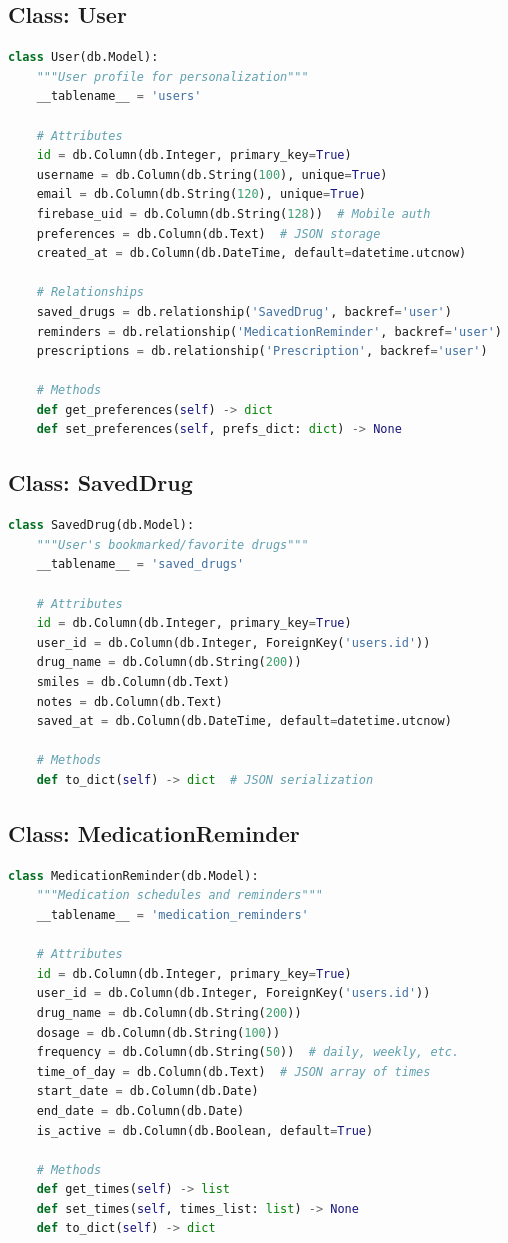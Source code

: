 \documentclass[12pt,a4paper]{report}
\begin{document}
\subsection{Class: User}
\begin{lstlisting}[language=Python]
class User(db.Model):
    """User profile for personalization"""
    __tablename__ = 'users'
    
    # Attributes
    id = db.Column(db.Integer, primary_key=True)
    username = db.Column(db.String(100), unique=True)
    email = db.Column(db.String(120), unique=True)
    firebase_uid = db.Column(db.String(128))  # Mobile auth
    preferences = db.Column(db.Text)  # JSON storage
    created_at = db.Column(db.DateTime, default=datetime.utcnow)
    
    # Relationships
    saved_drugs = db.relationship('SavedDrug', backref='user')
    reminders = db.relationship('MedicationReminder', backref='user')
    prescriptions = db.relationship('Prescription', backref='user')
    
    # Methods
    def get_preferences(self) -> dict
    def set_preferences(self, prefs_dict: dict) -> None
\end{lstlisting}

\subsection{Class: SavedDrug}
\begin{lstlisting}[language=Python]
class SavedDrug(db.Model):
    """User's bookmarked/favorite drugs"""
    __tablename__ = 'saved_drugs'
    
    # Attributes
    id = db.Column(db.Integer, primary_key=True)
    user_id = db.Column(db.Integer, ForeignKey('users.id'))
    drug_name = db.Column(db.String(200))
    smiles = db.Column(db.Text)
    notes = db.Column(db.Text)
    saved_at = db.Column(db.DateTime, default=datetime.utcnow)
    
    # Methods
    def to_dict(self) -> dict  # JSON serialization
\end{lstlisting}

\subsection{Class: MedicationReminder}
\begin{lstlisting}[language=Python]
class MedicationReminder(db.Model):
    """Medication schedules and reminders"""
    __tablename__ = 'medication_reminders'
    
    # Attributes
    id = db.Column(db.Integer, primary_key=True)
    user_id = db.Column(db.Integer, ForeignKey('users.id'))
    drug_name = db.Column(db.String(200))
    dosage = db.Column(db.String(100))
    frequency = db.Column(db.String(50))  # daily, weekly, etc.
    time_of_day = db.Column(db.Text)  # JSON array of times
    start_date = db.Column(db.Date)
    end_date = db.Column(db.Date)
    is_active = db.Column(db.Boolean, default=True)
    
    # Methods
    def get_times(self) -> list
    def set_times(self, times_list: list) -> None
    def to_dict(self) -> dict
\end{lstlisting}
\end{document}
